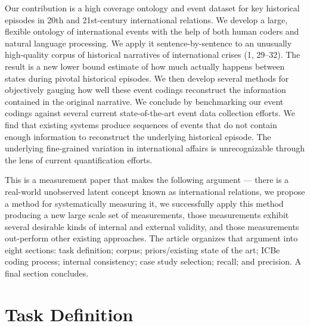 \documentclass{article}
\begin{document}
Our contribution is a high coverage ontology and event dataset for key
historical episodes in 20th and 21st-century international relations. We
develop a large, flexible ontology of international events with the help
of both human coders and natural language processing. We apply it
sentence-by-sentence to an unusually high-quality corpus of historical
narratives of international crises (1, 29--32). The result is a new
lower bound estimate of how much actually happens between states during
pivotal historical episodes. We then develop several methods for
objectively gauging how well these event codings reconstruct the
information contained in the original narrative. We conclude by
benchmarking our event codings against several current state-of-the-art
event data collection efforts. We find that existing systems produce
sequences of events that do not contain enough information to
reconstruct the underlying historical episode. The underlying
fine-grained variation in international affairs is unrecognizable
through the lens of current quantification efforts.

This is a measurement paper that makes the following argument --- there
is a real-world unobserved latent concept known as international
relations, we propose a method for systematically measuring it, we
successfully apply this method producing a new large scale set of
measurements, those measurements exhibit several desirable kinds of
internal and external validity, and those measurements out-perform other
existing approaches. The article organizes that argument into eight
sections: task definition; corpus; priors/existing state of the art;
ICBe coding process; internal consistency; case study selection; recall;
and precision. A final section concludes.

\hypertarget{task-definition}{%
\section*{Task Definition}\label{task-definition}}
\end{document}
